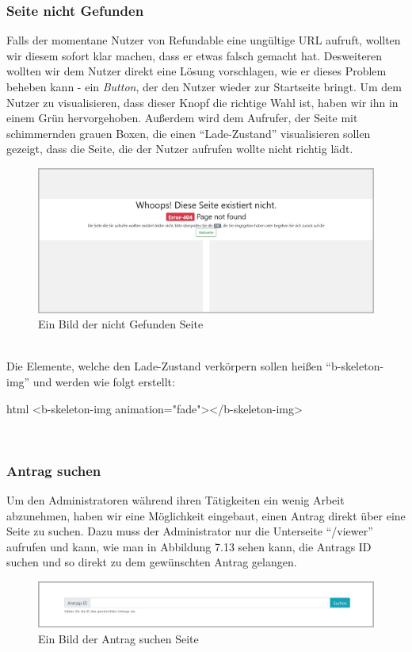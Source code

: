 \subsubsection{Seite nicht Gefunden}
Falls der momentane Nutzer von Refundable eine ungültige URL aufruft, wollten wir diesem sofort klar machen, dass er etwas falsch gemacht hat. Desweiteren wollten wir dem Nutzer direkt eine Lösung vorschlagen, wie er dieses Problem beheben kann - ein \textit{Button}, der den Nutzer wieder zur Startseite bringt. Um dem Nutzer zu visualisieren, dass dieser Knopf die richtige Wahl ist, haben wir ihn in einem Grün hervorgehoben. Außerdem wird dem Aufrufer, der Seite mit schimmernden grauen Boxen, die einen \enquote{Lade-Zustand} visualisieren sollen gezeigt, dass die Seite, die der Nutzer aufrufen wollte nicht richtig lädt.
\begin{figure}[H]
	\centering
	\includegraphics[width=1\linewidth]{images/website/notfound}
	\caption[Neuer Schulantrag]{Ein Bild der nicht Gefunden Seite}
	\label{fig:notfoundsite}
\end{figure}
~\\
Die Elemente, welche den Lade-Zustand verkörpern sollen heißen \enquote{b-skeleton-img} und werden wie folgt erstellt:
\begin{code}{html}
	<b-skeleton-img animation="fade"></b-skeleton-img>
\end{code}
	\label{list:codeskeleton} ~\\

\newpage
\subsubsection{Antrag suchen}
Um den Administratoren während ihren Tätigkeiten ein wenig Arbeit abzunehmen, haben wir eine Möglichkeit eingebaut, einen Antrag direkt über eine Seite zu suchen. Dazu muss der Administrator nur die Unterseite \enquote{/viewer} aufrufen und kann, wie man in Abbildung 7.13 sehen kann, die Antrags ID suchen und so direkt zu dem gewünschten Antrag gelangen.
\begin{figure}[H]
	\centering
	\includegraphics[width=1\linewidth]{images/website/search}
	\caption[Neuer Schulantrag]{Ein Bild der Antrag suchen Seite}
	\label{fig:searchsite}
\end{figure}
~\\

